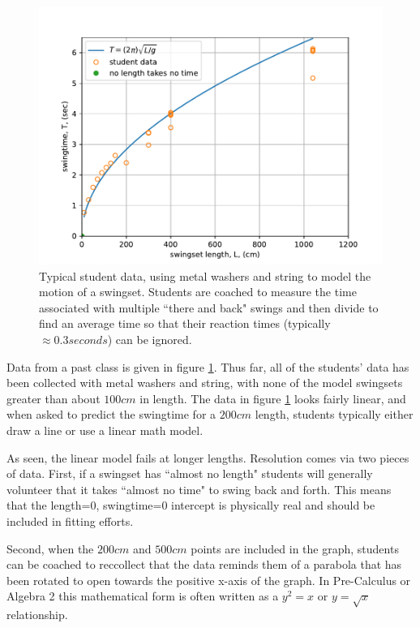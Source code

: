 \documentclass[12pt]{iopart}
\begin{document}
\begin{figure}[h]
\centering
	\includegraphics[width=\columnwidth]{linear_swingtime_graph.pdf}
\caption{
Typical student data, using metal washers and string to model the motion of a swingset.
        Students are coached to measure the time associated with multiple ``there and back" swings and then divide to find an average time so that their reaction times (typically $\approx0.3 seconds$) can be ignored.
        }
        \label{swingtime_graph}
\end{figure}

Data from a past class is given in figure \ref{swingtime_graph}. Thus far, all of the students' data has been collected with metal washers and string, with none of the model swingsets greater than about $100cm$ in length. The data in figure \ref{swingtime_graph} looks fairly linear, and when asked  to predict the swingtime for a $200cm$ length, students typically either draw a line or use a linear math model.  

As seen, the linear model fails at longer lengths. Resolution comes via two pieces of data.  First, if a swingset has ``almost no length" students will generally volunteer that it takes ``almost no time" to swing back and forth.  This means that the length=0, swingtime=0 intercept is physically real and should be included in fitting efforts.  

Second, when the $200cm$ and $500cm$ points are included in the graph, students can be coached to reccollect that the data reminds them of a parabola that has been rotated to open towards the positive x-axis of the graph.  In Pre-Calculus or Algebra 2 this mathematical form is often written as a $y^2=x$ or $y=\sqrt{x}$ relationship.  
\end{document}
